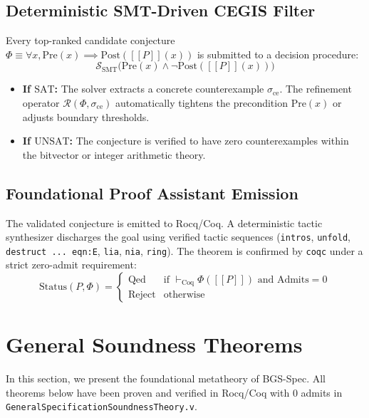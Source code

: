 \documentclass[10pt,journal,compsoc]{IEEEtran}
\newcommand{\llbracket}{[\![}
\newcommand{\rrbracket}{]\!]}
\begin{document}
\subsection{Deterministic SMT-Driven CEGIS Filter}
Every top-ranked candidate conjecture $\Phi \equiv \forall x, \text{Pre}(x) \implies \text{Post}(\llbracket P \rrbracket(x))$ is submitted to a decision procedure:
\begin{equation}
\mathcal{S}_{\text{SMT}} \Big( \text{Pre}(x) \land \neg \text{Post}(\llbracket P \rrbracket(x)) \Big)
\end{equation}
\begin{itemize}
    \item \textbf{If $\text{SAT}$:} The solver extracts a concrete counterexample $\sigma_{\text{ce}}$. The refinement operator $\mathcal{R}(\Phi, \sigma_{\text{ce}})$ automatically tightens the precondition $\text{Pre}(x)$ or adjusts boundary thresholds.
    \item \textbf{If $\text{UNSAT}$:} The conjecture is verified to have zero counterexamples within the bitvector or integer arithmetic theory.
\end{itemize}

\subsection{Foundational Proof Assistant Emission}
The validated conjecture is emitted to Rocq/Coq. A deterministic tactic synthesizer discharges the goal using verified tactic sequences (\texttt{intros}, \texttt{unfold}, \texttt{destruct ... eqn:E}, \texttt{lia}, \texttt{nia}, \texttt{ring}). The theorem is confirmed by \texttt{coqc} under a strict zero-admit requirement:
\begin{equation}
\text{Status}(P, \Phi) = \begin{cases} \text{Qed} & \text{if } \vdash_{\text{Coq}} \Phi(\llbracket P \rrbracket) \text{ and } \text{Admits} = 0 \\ \text{Reject} & \text{otherwise} \end{cases}
\end{equation}

\section{General Soundness Theorems}
\label{sec:soundness}

In this section, we present the foundational metatheory of BGS-Spec. All theorems below have been proven and verified in Rocq/Coq with 0 admits in \texttt{GeneralSpecificationSoundnessTheory.v}.
\end{document}
